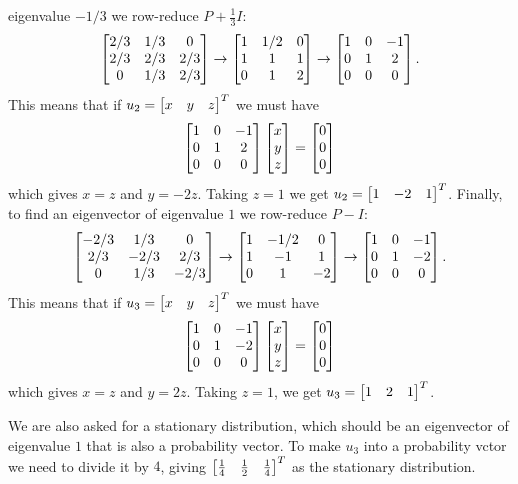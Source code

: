 \documentclass[a4paper]{amsart}
\renewenvironment{solution}{\SolutionInline}{\endSolutionInline}
\begin{document}
\begin{solution}
 eigenvalue $-1/3$ we row-reduce $P+\frac{1}{3}I$:
 \[ \left[\begin{matrix} 2/3 & 1/3 & 0 \\ 2/3 & 2/3 & 2/3 \\ 0 & 1/3 & 2/3 \end{matrix}\right] 
    \to 
    \left[\begin{matrix} 1 & 1/2 & 0 \\ 1 & 1 & 1 \\ 0 & 1 & 2 \end{matrix}\right]
    \to
    \left[\begin{matrix} 1 & 0 & -1 \\ 0 & 1 & 2 \\ 0 & 0 & 0 \end{matrix}\right].
 \]
 This means that if $u_2=\left[\begin{matrix} x&y&z\end{matrix}\right]^T$ we must have
 \[ \left[\begin{matrix} 1 & 0 & -1 \\ 0 & 1 & 2 \\ 0 & 0 & 0 \end{matrix}\right]
     \left[\begin{matrix} x \\ y \\ z\end{matrix}\right] = \left[\begin{matrix} 0 \\ 0 \\ 0 \end{matrix}\right] 
 \]
 which gives $x=z$ and $y=-2z$.  Taking $z=1$ we get
 $u_2=\left[\begin{matrix} 1&-2&1\end{matrix}\right]^T$.  Finally, to find an eigenvector of
 eigenvalue $1$ we row-reduce $P-I$:
 \[ \left[\begin{matrix} -2/3 & 1/3 & 0 \\ 2/3 & -2/3 & 2/3 \\ 0 & 1/3 & -2/3 \end{matrix}\right] 
    \to 
    \left[\begin{matrix} 1 & -1/2 & 0 \\ 1 & -1 & 1 \\ 0 & 1 & -2 \end{matrix}\right]
    \to
    \left[\begin{matrix} 1 & 0 & -1 \\ 0 & 1 & -2 \\ 0 & 0 & 0 \end{matrix}\right].
 \]
 This means that if $u_3=\left[\begin{matrix} x&y&z\end{matrix}\right]^T$ we must have
 \[ \left[\begin{matrix} 1 & 0 & -1 \\ 0 & 1 & -2 \\ 0 & 0 & 0 \end{matrix}\right]
     \left[\begin{matrix} x \\ y \\ z\end{matrix}\right] = \left[\begin{matrix} 0 \\ 0 \\ 0 \end{matrix}\right] 
 \]
 which gives $x=z$ and $y=2z$.  Taking $z=1$, we get
 $u_3=\left[\begin{matrix} 1&2&1\end{matrix}\right]^T$.  

 We are also asked for a stationary distribution, which should be an
 eigenvector of eigenvalue $1$ that is also a probability vector.  To
 make $u_3$ into a probability vctor we need to divide it by $4$,
 giving $\left[\begin{matrix} \frac{1}{4}&\frac{1}{2}&\frac{1}{4}\end{matrix}\right]^T$ as the
 stationary distribution.
\end{solution}
\end{document}
